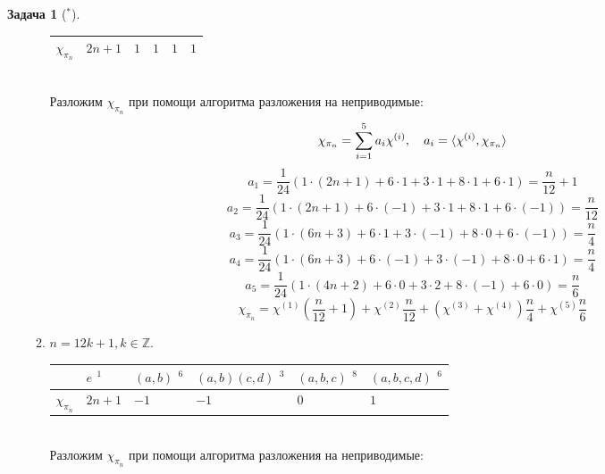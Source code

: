 \documentclass[12pt]{article}
\theoremstyle{definition}
\newtheorem{zad}{Задача}[section]
\begin{document}
\begin{zad}[$^*$]
\begin{itemize}
\begin{enumerate}
\begin{table}[h!]
\begin{tabular}{|l|l|l|l|l|l|}
    $\chi_{\pi_n}$ & $2n+1$ & $1$ & $1$ & $1$ & $1$ \\ \hline
    \end{tabular}
    \end{table}\\
    Разложим $\chi_{\pi_n}$ при помощи алгоритма разложения на неприводимые:
    \begin{equation}
        \chi_{\pi_n}=\sum\limits_{i=1}^5 a_i\chi^{(i)},\quad a_i=\braket{\chi^{(i)},\chi_{\pi_n}}
    \end{equation}
    \begin{equation}
        a_1=\frac{1}{24}(1\cdot(2n+1)+6\cdot1+3\cdot1+8\cdot1+6\cdot1)=\frac{n}{12}+1
    \end{equation}
    \begin{equation}
        a_2=\frac{1}{24}(1\cdot(2n+1)+6\cdot(-1)+3\cdot1+8\cdot1+6\cdot(-1))=\frac{n}{12}
    \end{equation}
    \begin{equation}
        a_3=\frac{1}{24}(1\cdot(6n+3)+6\cdot1+3\cdot(-1)+8\cdot0+6\cdot(-1))=\frac{n}{4}
    \end{equation}
    \begin{equation}
        a_4=\frac{1}{24}(1\cdot(6n+3)+6\cdot(-1)+3\cdot(-1)+8\cdot0+6\cdot1)=\frac{n}{4}
    \end{equation}
    \begin{equation}
        a_5=\frac{1}{24}(1\cdot(4n+2)+6\cdot0+3\cdot2+8\cdot(-1)+6\cdot0)=\frac{n}{6}
    \end{equation}
    \begin{equation}
        \boxed{\chi_{\pi_n}=\chi^{(1)}\left(\frac{n}{12}+1\right)+\chi^{(2)}\frac{n}{12}+(\chi^{(3)}+\chi^{(4)})\frac{n}{4}+\chi^{(5)}\frac{n}{6}}
    \end{equation}
    \item $n=12k+1,k\in\mathbb{Z}$.
    \begin{table}[h!]
    \centering
    \begin{tabular}{|l|l|l|l|l|l|}
    \hline
     & $e$ $^1$ & $(a,b)$ $^6$ & $(a,b)(c,d)$ $^3$ & $(a,b,c)$ $^8$ & $(a,b,c,d)$ $^6$ \\ \hline
    $\chi_{\pi_n}$ & $2n+1$ & $-1$ & $-1$ & $0$ & $1$ \\ \hline
    \end{tabular}
    \end{table}\\
    Разложим $\chi_{\pi_n}$ при помощи алгоритма разложения на неприводимые:
    \begin{equation}

\end{equation}
\end{enumerate}
\end{itemize}
\end{zad}
\end{document}
